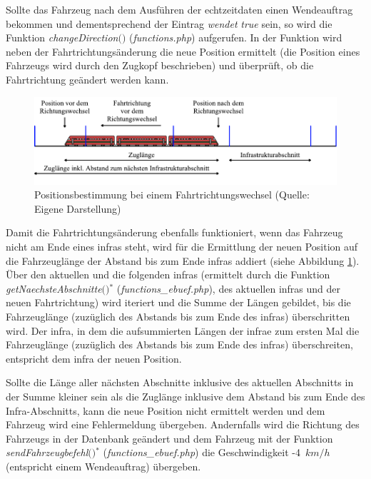 Sollte das Fahrzeug nach dem Ausführen der \Gls{echtzeitdaten} einen Wendeauftrag bekommen und dementsprechend der Eintrag \textit{wendet} \textit{true} sein, so wird die Funktion \textit{change\-Direction$($$)$} (\textit{functions.php}) aufgerufen. In der Funktion wird neben der Fahrtrichtungsänderung die neue Position ermittelt (die Position eines Fahrzeugs wird durch den Zugkopf beschrieben) und überprüft, ob die Fahrtrichtung geändert werden kann. 
\begin{figure}
  \includegraphics[width=\linewidth]{../images/vector/richtungsaenderung.pdf}
  \caption[Positionsbestimmung bei einem Fahrtrichtungswechsel]{Positionsbestimmung bei einem Fahrtrichtungswechsel (Quelle: Eigene Darstellung)}
  \label{fig:richtungsaenderung}
\end{figure}
Damit die Fahrtrichtungsänderung ebenfalls funktioniert, wenn das Fahrzeug nicht am Ende eines \ac{infra}s steht, wird für die Ermittlung der neuen Position auf die Fahrzeuglänge der Abstand bis zum Ende \ac{infra}s addiert (siehe Abbildung \ref{fig:richtungsaenderung}). Über den aktuellen und die folgenden \acp{infra} (ermittelt durch die Funktion \textit{getNaechsteAbschnitte$($$)$}$^\ast$ (\textit{functions\_ebuef.php}), des aktuellen \ac{infra}s und der neuen Fahrtrichtung) wird iteriert und die Summe der Längen gebildet, bis die Fahrzeuglänge (zuzüglich des Abstands bis zum Ende des \ac{infra}s) überschritten wird. Der \ac{infra}, in dem die aufsummierten Längen der \ac{infra}e zum ersten Mal die Fahrzeuglänge (zuzüglich des Abstands bis zum Ende des \ac{infra}s) überschreiten, entspricht dem \ac{infra} der neuen Position.

Sollte die Länge aller nächsten Abschnitte inklusive des aktuellen Abschnitts in der Summe kleiner sein als die Zuglänge inklusive dem Abstand bis zum Ende des Infra-Abschnitts, kann die neue Position nicht ermittelt werden und dem Fahrzeug wird eine Fehlermeldung übergeben. Andernfalls wird die Richtung des Fahrzeugs in der Datenbank geändert und dem Fahrzeug mit der Funktion \textit{send\-Fahrzeugbefehl$($$)$}$^\ast$ (\textit{functions\_ebuef.php}) die Geschwindigkeit \mbox{-4 $km/h$} (entspricht einem Wendeauftrag) übergeben.

